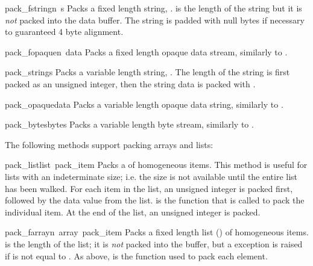 \begin{funcdesc}{pack_fstring}{n\, s}
Packs a fixed length string, .   is the length of the
string but it is \emph{not} packed into the data buffer.  The string
is padded with null bytes if necessary to guaranteed 4 byte alignment.
\end{funcdesc}

\begin{funcdesc}{pack_fopaque}{n\, data}
Packs a fixed length opaque data stream, similarly to
.
\end{funcdesc}

\begin{funcdesc}{pack_string}{s}
Packs a variable length string, .  The length of the string is
first packed as an unsigned integer, then the string data is packed
with .
\end{funcdesc}

\begin{funcdesc}{pack_opaque}{data}
Packs a variable length opaque data string, similarly to
.
\end{funcdesc}

\begin{funcdesc}{pack_bytes}{bytes}
Packs a variable length byte stream, similarly to .
\end{funcdesc}

The following methods support packing arrays and lists:

\begin{funcdesc}{pack_list}{list\, pack_item}
Packs a  of homogeneous items.  This method is useful for
lists with an indeterminate size; i.e. the size is not available until
the entire list has been walked.  For each item in the list, an
unsigned integer  is packed first, followed by the data value
from the list.   is the function that is called to pack
the individual item.  At the end of the list, an unsigned integer
 is packed.
\end{funcdesc}

\begin{funcdesc}{pack_farray}{n\, array\, pack_item}
Packs a fixed length list () of homogeneous items.  
is the length of the list; it is \emph{not} packed into the buffer,
but a  exception is raised if  is not
equal to .  As above,  is the function used to
pack each element.
\end{funcdesc}


